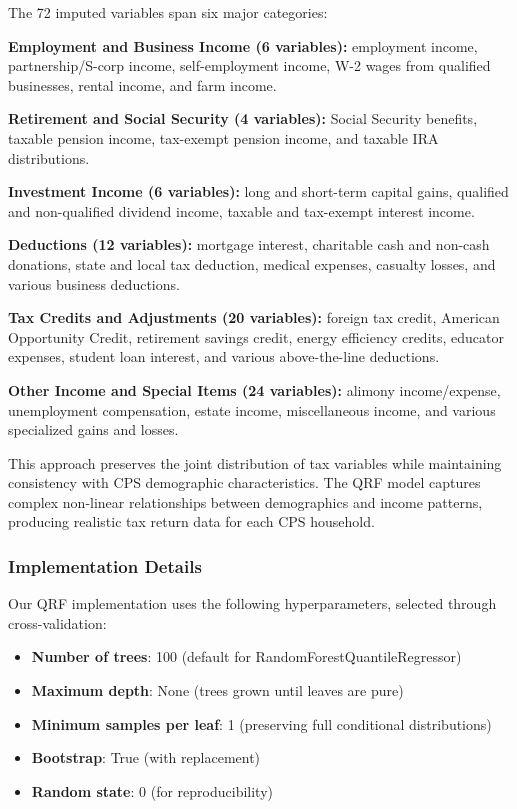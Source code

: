 The 72 imputed variables span six major categories:

\textbf{Employment and Business Income (6 variables):} employment income, partnership/S-corp income, self-employment income, W-2 wages from qualified businesses, rental income, and farm income.

\textbf{Retirement and Social Security (4 variables):} Social Security benefits, taxable pension income, tax-exempt pension income, and taxable IRA distributions.

\textbf{Investment Income (6 variables):} long and short-term capital gains, qualified and non-qualified dividend income, taxable and tax-exempt interest income.

\textbf{Deductions (12 variables):} mortgage interest, charitable cash and non-cash donations, state and local tax deduction, medical expenses, casualty losses, and various business deductions.

\textbf{Tax Credits and Adjustments (20 variables):} foreign tax credit, American Opportunity Credit, retirement savings credit, energy efficiency credits, educator expenses, student loan interest, and various above-the-line deductions.

\textbf{Other Income and Special Items (24 variables):} alimony income/expense, unemployment compensation, estate income, miscellaneous income, and various specialized gains and losses.

This approach preserves the joint distribution of tax variables while maintaining consistency with CPS demographic characteristics. The QRF model captures complex non-linear relationships between demographics and income patterns, producing realistic tax return data for each CPS household.

\subsubsection{Implementation Details}

Our QRF implementation uses the following hyperparameters, selected through cross-validation:
\begin{itemize}
    \item \textbf{Number of trees}: 100 (default for RandomForestQuantileRegressor)
    \item \textbf{Maximum depth}: None (trees grown until leaves are pure)
    \item \textbf{Minimum samples per leaf}: 1 (preserving full conditional distributions)
    \item \textbf{Bootstrap}: True (with replacement)
    \item \textbf{Random state}: 0 (for reproducibility)
\end{itemize}


